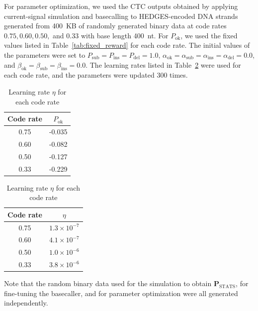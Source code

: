 \documentclass[sotsuron]{kuee}
\begin{document}
For parameter optimization, we used the CTC outputs obtained by applying current-signal
simulation and basecalling to HEDGES-encoded DNA strands generated from 400~KB of randomly
generated binary data at code rates $0.75, 0.60, 0.50,$ and $0.33$ with base length 400~nt.
For $P_{\mathrm{ok}}$, we used the fixed values listed in
Table~\ref{tab:fixed_reward} for each code rate.
The initial values of the parameters were set to
$P_{\mathrm{sub}}=P_{\mathrm{ins}}=P_{\mathrm{del}}=1.0$,
$\alpha_{\mathrm{ok}}=\alpha_{\mathrm{sub}}=\alpha_{\mathrm{ins}}=\alpha_{\mathrm{del}}=0.0$, and
$\beta_{\mathrm{ok}}=\beta_{\mathrm{sub}}=\beta_{\mathrm{ins}}=0.0$.
The learning rates listed in Table~\ref{tab:learning_rate} were used for each code rate, and the
parameters were updated 300 times.
\begin{table}
  \centering
  \begin{minipage}{0.48\linewidth}
    \centering
    \caption{Fixed reward values $P_{\mathrm{ok}}$ for each code rate}
    \label{tab:fixed_reward}
    \begin{tabular}{c|c}
      \hline
      Code rate & $P_{\mathrm{ok}}$ \\
      \hline
      0.75 & -0.035 \\
      0.60 & -0.082 \\
      0.50 & -0.127 \\
      0.33 & -0.229 \\
      \hline
    \end{tabular}
  \end{minipage}
  \hfill
  \begin{minipage}{0.48\linewidth}
    \centering
    \caption{Learning rate $\eta$ for each code rate}
    \label{tab:learning_rate}
    \begin{tabular}{c|c}
      \hline
      Code rate & $\eta$ \\
      \hline
      0.75 & $1.3 \times 10^{-7}$ \\
      0.60 &  $4.1 \times 10^{-7}$\\
      0.50 &  $1.0 \times 10^{-6}$ \\
      0.33 &  $3.8 \times 10^{-6}$ \\
      \hline
    \end{tabular}
  \end{minipage}
\end{table}
Note that the random binary data used for the simulation to obtain $\bm{P}_{\mathrm{STATS}}$, for
fine-tuning the basecaller, and for parameter optimization were all generated independently.
\end{document}
